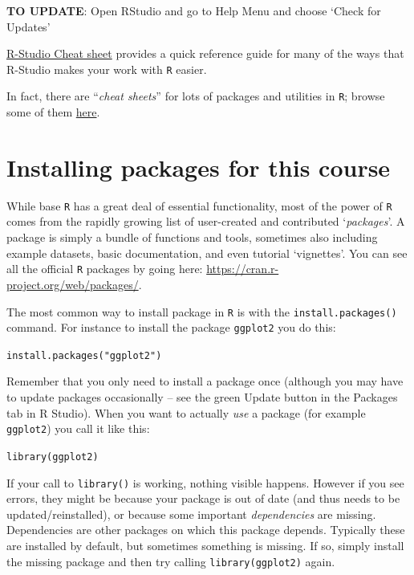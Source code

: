 \documentclass[
]{book}
\newenvironment{rmdtip}[1]
  {
  \begin{itemize}
  \renewcommand{\labelitemi}{
    \raisebox{-.7\height}[0pt][0pt]{
      {\setkeys{Gin}{width=3em,keepaspectratio}\texttt{[image: images/\#1]}}
    }
  }
  \setlength{\fboxsep}{1em}
  \begin{tip}
  \item
  }
  {
  \end{tip}
  \end{itemize}
  }
\begin{document}
\textbf{TO UPDATE}: Open RStudio and go to Help Menu and choose `Check for Updates'

\begin{rmdtip}{tip}
\href{https://raw.githubusercontent.com/rstudio/cheatsheets/main/rstudio-ide.pdf}{R-Studio Cheat sheet} provides a quick reference guide for many of the ways that R-Studio makes your work with \texttt{R} easier.

In fact, there are ``\emph{cheat sheets}'' for lots of packages and utilities in \texttt{R}; browse some of them \href{https://www.rstudio.com/resources/cheatsheets/}{here}.

\end{rmdtip}

\hypertarget{installing-packages-for-this-course}{%
\chapter*{Installing packages for this course}\label{installing-packages-for-this-course}}

While base \texttt{R} has a great deal of essential functionality, most of the power of \texttt{R} comes from the rapidly growing list of user-created and contributed `\emph{packages}'. A package is simply a bundle of functions and tools, sometimes also including example datasets, basic documentation, and even tutorial `vignettes'. You can see all the official \texttt{R} packages by going here: \url{https://cran.r-project.org/web/packages/}.

The most common way to install package in \texttt{R} is with the \texttt{install.packages()} command. For instance to install the package \texttt{ggplot2} you do this:

\texttt{install.packages("ggplot2")}

Remember that you only need to install a package once (although you may have to update packages occasionally -- see the green Update button in the Packages tab in R Studio). When you want to actually \emph{use} a package (for example \texttt{ggplot2}) you call it like this:

\texttt{library(ggplot2)}

If your call to \texttt{library()} is working, nothing visible happens. However if you see errors, they might be because your package is out of date (and thus needs to be updated/reinstalled), or because some important \emph{dependencies} are missing. Dependencies are other packages on which this package depends. Typically these are installed by default, but sometimes something is missing. If so, simply install the missing package and then try calling \texttt{library(ggplot2)} again.
\end{document}
